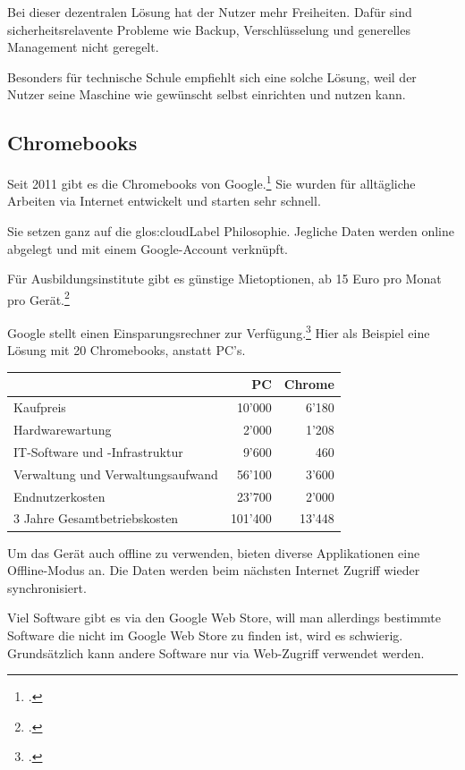 Bei dieser dezentralen Lösung hat der Nutzer mehr Freiheiten. Dafür sind sicherheitsrelavente Probleme wie Backup, Verschlüsselung und generelles Management nicht geregelt.

Besonders für technische Schule empfiehlt sich eine solche Lösung, weil der Nutzer seine Maschine wie gewünscht selbst einrichten und nutzen kann.

\subsection{Chromebooks}
Seit 2011 gibt es die Chromebooks von Google.\footcite{Chromebooks_bersicht_2014-12-27}
Sie wurden für alltägliche Arbeiten via Internet entwickelt und starten sehr schnell.

Sie setzen ganz auf die \Gls{glos:cloudLabel} Philosophie. Jegliche Daten werden online abgelegt und mit einem Google-Account verknüpft.

Für Ausbildungsinstitute gibt es günstige Mietoptionen, ab 15 Euro pro Monat pro Gerät.\footcite{Chromebook_Wikipedia_2014-12-27}

Google stellt einen Einsparungsrechner zur Verfügung.\footcite{Chromebooks_und_Chromeboxes_for_Education_2014-12-27}
Hier als Beispiel eine Lösung mit 20 Chromebooks, anstatt PC's.

\begin{table}[hb]
	\centering
	\small\renewcommand{\arraystretch}{1.4}

	\begin{tabular}{lrr}
		\hline
		\rowcolor{tableheadcolor}
		 & PC & Chrome \\
		\hline
		Kaufpreis & 10'000 & 6'180\\
		Hardwarewartung & 2'000 & 1'208\\
		IT-Software und -Infrastruktur & 9'600 & 460\\
		Verwaltung und Verwaltungsaufwand & 56'100 & 3'600\\
		Endnutzerkosten & 23'700 & 2'000\\
		3 Jahre Gesamtbetriebskosten & 101'400 & 13'448\\
		\hline
	\end{tabular}
\end{table}

Um das Gerät auch offline zu verwenden, bieten diverse Applikationen eine Offline-Modus an. Die Daten werden beim nächsten Internet Zugriff wieder synchronisiert.

Viel Software gibt es via den Google Web Store, will man allerdings bestimmte Software die nicht im Google Web Store zu finden ist, wird es schwierig.
Grundsätzlich kann andere Software nur via Web-Zugriff verwendet werden.
